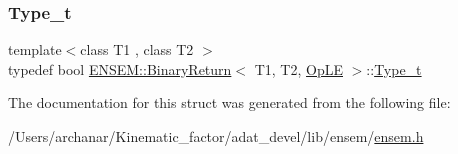 \mbox{\label{structENSEM_1_1BinaryReturn_3_01T1_00_01T2_00_01OpLE_01_4_a052f794f01ea501a773007550e90886d}} 
\subsubsection{\texorpdfstring{Type\_t}{Type\_t}\hspace{0.1cm}{\footnotesize\ttfamily [2/2]}}
{\footnotesize\ttfamily template$<$class T1 , class T2 $>$ \\
typedef bool \mbox{\hyperlink{structENSEM_1_1BinaryReturn}{E\+N\+S\+E\+M\+::\+Binary\+Return}}$<$ T1, T2, \mbox{\hyperlink{structENSEM_1_1OpLE}{Op\+LE}} $>$\+::\mbox{\hyperlink{structENSEM_1_1BinaryReturn_3_01T1_00_01T2_00_01OpLE_01_4_a052f794f01ea501a773007550e90886d}{Type\+\_\+t}}}



The documentation for this struct was generated from the following file\+:\begin{DoxyCompactItemize}
\item 
/\+Users/archanar/\+Kinematic\+\_\+factor/adat\+\_\+devel/lib/ensem/\mbox{\hyperlink{lib_2ensem_2ensem_8h}{ensem.\+h}}\end{DoxyCompactItemize}
